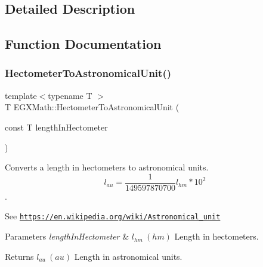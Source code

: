 \subsection{Detailed Description}


\subsection{Function Documentation}
\mbox{\label{group___e_g_x_math-_conversions-_length_conversions-_s_i-_hectometer-_astronomical_gaf66d80d2e1aeac562f9a5b67626cc46f}} 
\subsubsection{\texorpdfstring{Hectometer\+To\+Astronomical\+Unit()}{HectometerToAstronomicalUnit()}}
{\footnotesize\ttfamily template$<$typename T $>$ \\
T E\+G\+X\+Math\+::\+Hectometer\+To\+Astronomical\+Unit (\begin{DoxyParamCaption}\item[{const T}]{length\+In\+Hectometer }\end{DoxyParamCaption})}



Converts a length in hectometers to astronomical units. \[ l_{au}= \frac{1}{149597870700} l_{hm} * 10^{2} \]. 

See \href{https://en.wikipedia.org/wiki/Astronomical_unit}{\tt https\+://en.\+wikipedia.\+org/wiki/\+Astronomical\+\_\+unit} 
\begin{DoxyParams}{Parameters}
{\em length\+In\+Hectometer} & $ l_{hm}\ (hm)$ Length in hectometers. \\
\hline
\end{DoxyParams}
\begin{DoxyReturn}{Returns}
$ l_{au}\ (au)$ Length in astronomical units. 
\end{DoxyReturn}
\mbox{\label{group___e_g_x_math-_conversions-_length_conversions-_s_i-_hectometer-_astronomical_ga71004aaba27ec49989b80e41e2075376}} 
